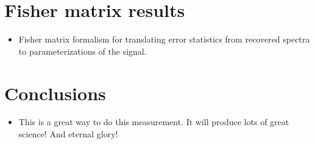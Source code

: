\documentclass[twolcolumn,apj]{emulateapj}
\begin{document}
\section{Fisher matrix results}
\begin{itemize}
\item Fisher matrix formalism for translating error statistics from recovered spectra to parameterizations of the signal.
\end{itemize}

\section{Conclusions}
\begin{itemize}
\item This is a great way to do this measurement.  It will produce lots of great science! And eternal glory!
\end{itemize}


\end{document}
